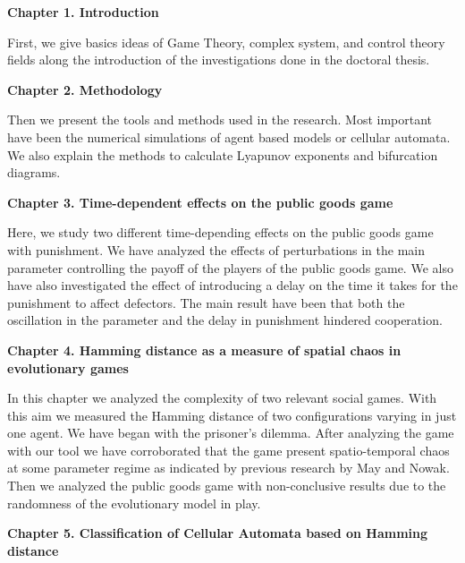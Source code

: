 
\clearpage

{\bf  Chapter 1. Introduction}

First, we give basics ideas of Game Theory, complex system, and control theory fields along the introduction of the investigations done in the doctoral thesis.

\vspace{0.6cm}

{\bf  Chapter 2. Methodology}

Then we present the tools and methods used in the research. Most important have been the numerical simulations of agent based models or cellular automata. We also explain the methods to calculate Lyapunov exponents and bifurcation diagrams.

\vspace{0.6cm}

{\bf  Chapter 3. Time-dependent effects on the public goods game}  
\vspace{0.6cm}

Here, we study two different time-depending effects on the public goods game with punishment. We have analyzed the effects of perturbations in the main parameter controlling the payoff of the players of the public goods game. We also have also investigated the effect of introducing a delay on the time it takes for the punishment to affect defectors. The main result have been that both the oscillation in the parameter and the delay in punishment hindered cooperation.

\vspace{0.6cm}

{\bf  Chapter 4. Hamming distance as a measure of spatial chaos in evolutionary games}  
\vspace{0.6cm}

In this chapter we analyzed the complexity of two relevant social games. With this aim we measured the Hamming distance of two configurations varying in just one agent. We have began with the prisoner's dilemma. After analyzing the game with our tool we have corroborated that the game present spatio-temporal chaos at some parameter regime as indicated by previous research by May and Nowak. Then we analyzed the public goods game with non-conclusive results due to the randomness of the evolutionary model in play.

\vspace{0.6cm}

{\bf  Chapter 5. Classification of Cellular Automata based on Hamming distance}


